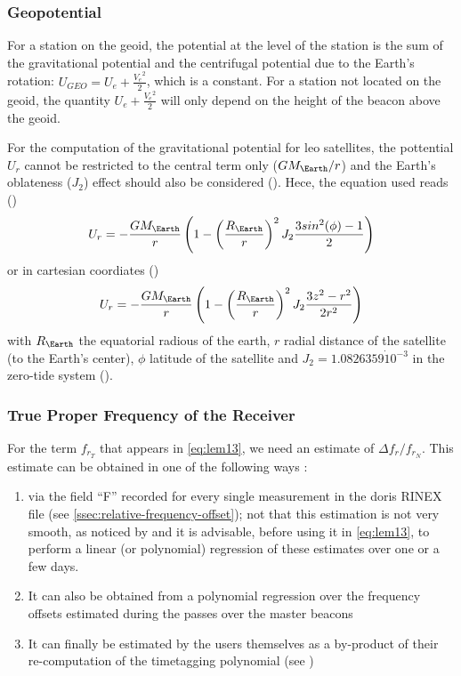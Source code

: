 \subsubsection{Geopotential}\label{sssec:doris-geopotential}
For a station on the geoid, the potential at the level of the station is the sum 
of the gravitational potential and the centrifugal potential due to the Earth's 
rotation: $U_{GEO} = U_e + \frac{{V_e}^2}{2}$, which is a constant. For a station 
not located on the geoid, the quantity $U_e + \frac{{V_e}^2}{2}$ will only depend 
on the height of the beacon above the geoid.

For the computation of the gravitational potential for \gls{leo} satellites, 
the pottential $U_r$ cannot be restricted to the central term only ($GM_{\Earth} / r$) and
the Earth's oblateness ($J_2$) effect should also be considered (\cite{Larson2007}). 
Hece, the equation used reads (\cite{Lemoine2016})
\begin{equation}\label{eq:lem18}
  U_r = 
    -\frac{GM_{\Earth}}{r} \left( 
      1 - 
      \left( \frac{R_{\Earth}}{r} \right) ^2 
      J_2 \frac{3 sin^2(\phi) - 1}{2} 
    \right)
\end{equation}
or in cartesian coordiates (\cite{Larson2007})
\begin{equation}
  U_r = -\frac{GM_{\Earth}}{r} \left( 1- \left(\frac{R_{\Earth}}{r}\right)^2 
    J_2 \frac{3 z^2 - r^2}{2r^2} \right)
\end{equation}
with $R_{\Earth}$ the equatorial radious of the earth, $r$ radial 
distance of the satellite (to the Earth's center), $\phi$ latitude of the 
satellite and $J_2 = 1.0826359 \dot 10^{-3}$ in the zero-tide system (\cite{iers2010}).

\subsubsection{True Proper Frequency of the Receiver}\label{sssec:true-proprtfrequency-of-the-receiver}
For the term $f_{r_T}$ that appears in \autoref{eq:lem13}, we need an estimate of 
$\Delta f_{r} / f_{r_N}$. This estimate can be obtained in one of the following ways 
\cite{Lemoine2016}:
\begin{enumerate}
    \item via the field ``F'' recorded for every single measurement in the \gls{doris} 
      RINEX file (see \autoref{ssec:relative-frequency-offset}); not that this estimation 
      is not very smooth, as noticed by \cite{Gao2015} and it is advisable, before 
      using it in \autoref{eq:lem13}, to perform a linear (or polynomial) regression of 
      these estimates over one or a few days.
    \item It can also be obtained from a polynomial regression
      over the frequency oﬀsets estimated during the passes
      over the master beacons
    \item It can ﬁnally be estimated by the users themselves as a
      by-product of their re-computation of the timetagging polynomial (see \cite{Mercier2010})
\end{enumerate}

